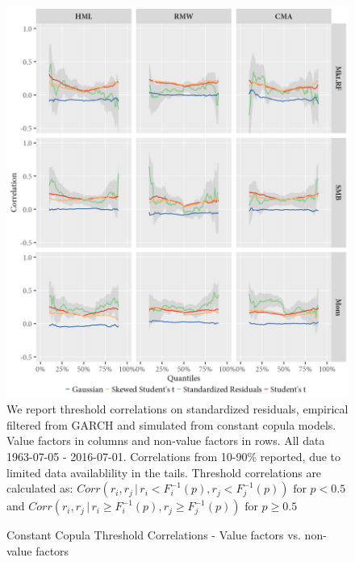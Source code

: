 \begin{figure}[H]
  \caption{Constant Copula Threshold Correlations - Value factors vs. non-value factors}
  \label{diag:thresholdnonvalue_copula}
  \toprule
  \centering
  \begin{minipage}{\textwidth}
  \includegraphics[scale=1]{graphics/threshold_Nonvalue_copula.png}  
  \bottomrule
  \vspace{3mm}
  \footnotesize
  We report threshold correlations on standardized residuals, empirical filtered from GARCH and simulated from constant copula models. Value factors in columns and non-value factors in rows. All data 1963-07-05 - 2016-07-01. Correlations from 10-90\% reported, due to limited data availablility in the tails. Threshold correlations are calculated as: $Corr(r_i, r_j \,|\, r_i < F_i^{-1}(p), r_j < F_j^{-1}(p)) \text{ for } p < 0.5$ and $Corr(r_i, r_j \,|\, r_i \geq F_i^{-1}(p), r_j \geq F_j^{-1}(p)) \text{ for } p \geq 0.5$ 
  \end{minipage}
\end{figure}

